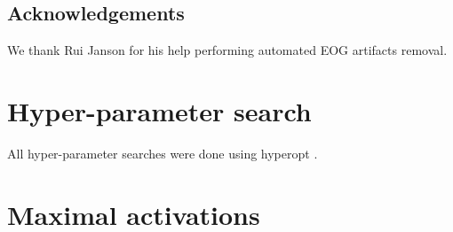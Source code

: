 \documentclass[utf8]{frontiersSCNS} %
\begin{document}
\section{Acknowledgements}

We thank Rui Janson for his help performing automated EOG artifacts removal.

\pagebreak



\pagebreak

\begin{appendices}
  \chapter{Hyper-parameter search} \label{apdx:hyperparams}

  All hyper-parameter searches were done using hyperopt \cite{Bergstra2013}.
  

  \chapter{Maximal activations} \label{apdx:max_act}

  
  
\end{appendices}
\end{document}
